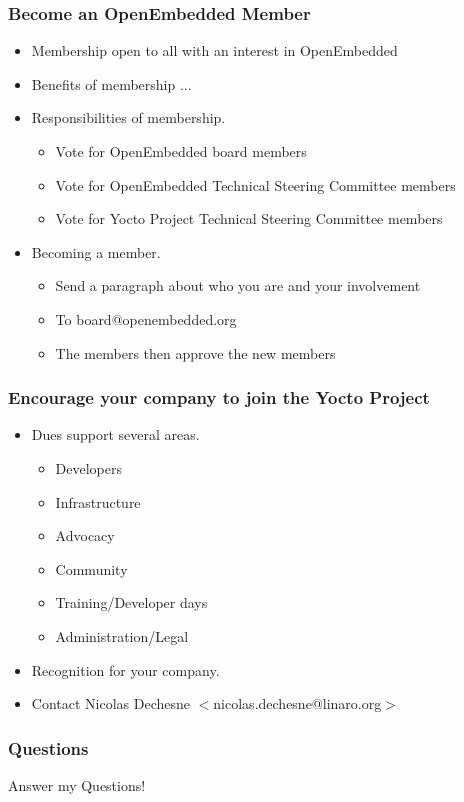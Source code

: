 \documentclass{beamer}
\begin{document}
\begin{frame}
	\frametitle{Become an OpenEmbedded Member}

	\begin{itemize}
		\item Membership open to all with an interest in OpenEmbedded
		\item Benefits of membership ...
		\item Responsibilities of membership.
			\begin{itemize}
				\item Vote for OpenEmbedded board members
				\item Vote for OpenEmbedded Technical Steering Committee members
				\item Vote for Yocto Project Technical Steering Committee members
			\end{itemize}
		\item Becoming a member.
			\begin{itemize}
				\item Send a paragraph about who you are and your involvement
				\item To board@openembedded.org
				\item The members then approve the new members
			\end{itemize}
	\end{itemize}
\end{frame}


\begin{frame}
	\frametitle{Encourage your company to join the Yocto Project}

	\begin{itemize}
		\item Dues support several areas.
			\begin{itemize}
				\item Developers
				\item Infrastructure
				\item Advocacy
				\item Community
				\item Training/Developer days
				\item Administration/Legal
			\end{itemize}
		\item Recognition for your company.
		\item Contact Nicolas Dechesne $<$nicolas.dechesne@linaro.org$>$
	\end{itemize}
\end{frame}


\begin{frame}
\frametitle{Questions}

Answer my Questions!

\end{frame}
\end{document}
